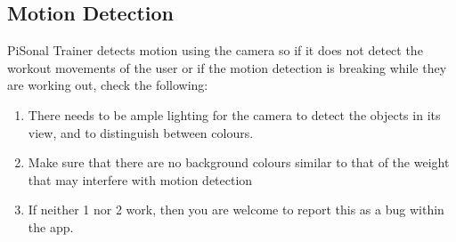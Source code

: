 \documentclass{article}
\begin{document}
\subsection{Motion Detection}
PiSonal Trainer detects motion using the camera so if it does not detect the workout movements of the user or if the motion detection is breaking while they are working out, check the following:

\begin{enumerate}
    \item There needs to be ample lighting for the camera to detect the objects in its view, and to distinguish between colours.
    \item Make sure that there are no background colours similar to that of the weight that may interfere with motion detection
    \item If neither 1 nor 2 work, then you are welcome to report this as a bug within the app.
\end{enumerate}
\end{document}
